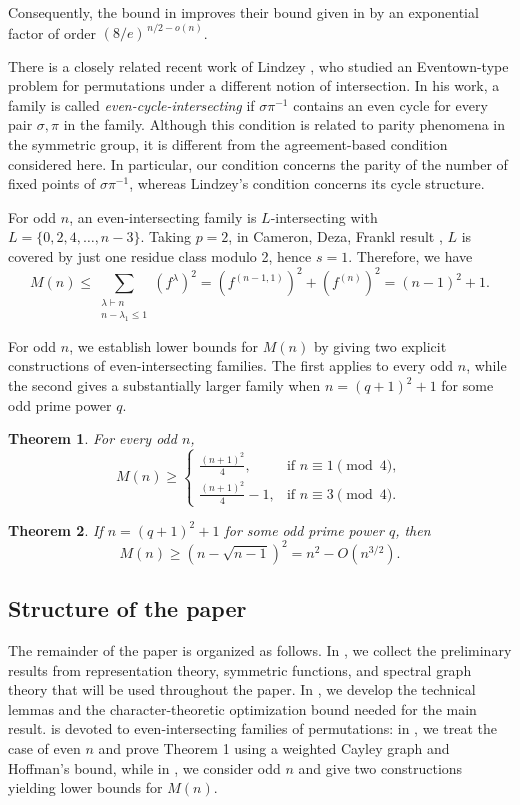 \documentclass[12pt]{article}
\newtheorem{theorem}{Theorem}
\theoremstyle{definition}
\newcommand{\1}{\mathbf 1}
\begin{document}
Consequently, the bound in  improves their bound given in  by an exponential
factor of order $\left({8}/{e}\right)^{\,n/2-o(n)}$.



There is a closely related recent work of Lindzey \cite{lindzey2026eventown}, who studied an Eventown-type problem for permutations under a different notion of intersection. In his work, a family is called \emph{even-cycle-intersecting} if $\sigma\pi^{-1}$ contains an even cycle for every pair $\sigma,\pi$ in the family. Although this condition is related to parity phenomena in the symmetric group, it is different from the agreement-based condition considered here. In particular, our condition concerns the parity of the number of fixed points of $\sigma\pi^{-1}$, whereas Lindzey's condition concerns its cycle structure. 

For odd $n$, an even-intersecting family is $L$-intersecting with $L=\{0,2,4,\ldots, n-3\}$. Taking  $p=2$, in Cameron, Deza, Frankl result \cite{cameron1987sharp},  $L$ is covered by just one residue class modulo 2, hence $s=1$. Therefore, we have
$$M(n)\leq \sum_{\substack{\lambda\vdash n\\ n-\lambda_1\leq 1}}
(f^\lambda)^2= \left(f^{(n-1,1)}\right)^2+\left(f^{(n)}\right)^2=(n-1)^2+1.$$

For odd $n$, we  establish lower bounds for $M(n)$ by giving two explicit constructions of even-intersecting families. The first applies to every odd $n$, while the second gives a substantially larger family when $n=(q+1)^2+1$ for some odd prime power $q$.

\begin{theorem}\label{Thm:loose lower bound}
For every odd $n$,
$$
M(n)\geq
\begin{cases}
\displaystyle \frac{(n+1)^2}{4},
& \text{if } n\equiv 1 \pmod 4,\\[2mm]
\displaystyle \frac{(n+1)^2}{4}-1,
& \text{if } n\equiv 3 \pmod 4.
\end{cases}
$$
\end{theorem}

\begin{theorem}\label{Thm:tight lower bound}
If $n=(q+1)^2+1$ for some odd prime power $q$, then
$$
M(n)\geq (n-\sqrt{n-1})^2=n^2-O(n^{3/2}).
$$
\end{theorem}
\subsection{Structure of the paper}
The remainder of the paper is organized as follows. In , we collect the preliminary results from representation theory, symmetric functions, and spectral graph theory that will be used throughout the paper. In , we develop the technical lemmas and the character-theoretic optimization bound needed for the main result.  is devoted to even-intersecting families of permutations: in , we treat the case of even $n$ and prove Theorem 1 using a weighted Cayley graph and Hoffman's bound, while in , we consider odd $n$ and give two constructions yielding lower bounds for $M(n)$.
\end{document}

